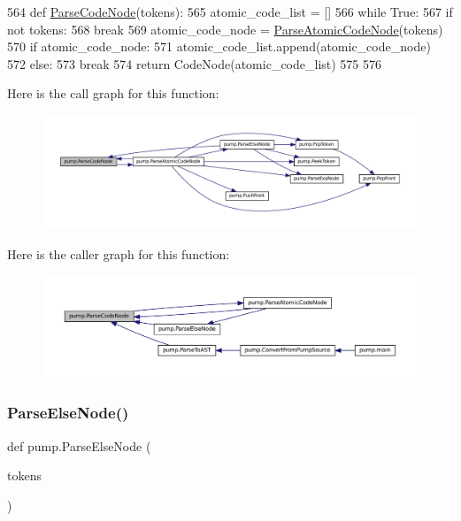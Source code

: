 \begin{DoxyCode}
564 \textcolor{keyword}{def }\hyperlink{namespacepump_aabbc064b8664abbe05618b3a0f5a6c38}{ParseCodeNode}(tokens):
565   atomic\_code\_list = []
566   \textcolor{keywordflow}{while} \textcolor{keyword}{True}:
567     \textcolor{keywordflow}{if} \textcolor{keywordflow}{not} tokens:
568       \textcolor{keywordflow}{break}
569     atomic\_code\_node = \hyperlink{namespacepump_a5532710f334f026f80fc485decf5078e}{ParseAtomicCodeNode}(tokens)
570     \textcolor{keywordflow}{if} atomic\_code\_node:
571       atomic\_code\_list.append(atomic\_code\_node)
572     \textcolor{keywordflow}{else}:
573       \textcolor{keywordflow}{break}
574   \textcolor{keywordflow}{return} CodeNode(atomic\_code\_list)
575 
576 
\end{DoxyCode}
Here is the call graph for this function\+:
\nopagebreak
\begin{figure}[H]
\begin{center}
\leavevmode
\includegraphics[width=350pt]{namespacepump_aabbc064b8664abbe05618b3a0f5a6c38_cgraph}
\end{center}
\end{figure}
Here is the caller graph for this function\+:
\nopagebreak
\begin{figure}[H]
\begin{center}
\leavevmode
\includegraphics[width=350pt]{namespacepump_aabbc064b8664abbe05618b3a0f5a6c38_icgraph}
\end{center}
\end{figure}
\mbox{\label{namespacepump_ae40493525a993e81929c6905e329a406}} 
\subsubsection{\texorpdfstring{Parse\+Else\+Node()}{ParseElseNode()}}
{\footnotesize\ttfamily def pump.\+Parse\+Else\+Node (\begin{DoxyParamCaption}\item[{}]{tokens }\end{DoxyParamCaption})}




